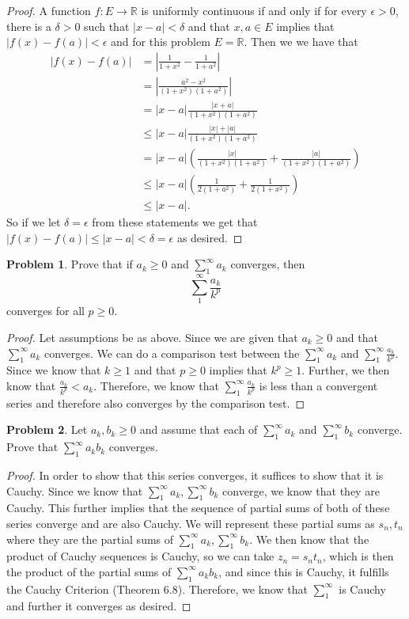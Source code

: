 \documentclass[11pt]{article}
\theoremstyle{definition}
\newtheorem{problem}{Problem}
\newcommand{\R}{\mathbb{R}}
\begin{document}
\begin{proof}
A function $f: E \rightarrow \R$ is uniformly continuous if and only if for every $\epsilon > 0$, there is a $\delta > 0$ such that $|x-a| < \delta$ and that $x, a\in E$ implies that $|f(x) - f(a)| < \epsilon$ and for this problem $E = \R$. Then we we have that
\begin{align*}
    |f(x) - f(a)| &= |\frac{1}{1+x^2}-\frac{1}{1+a^2}|\\
    &= |\frac{a^2 - x^2}{(1+x^2)(1+a^2)}|\\
    &= |x-a|\frac{|x+a|}{(1+x^2)(1+a^2)}\\
    &\leq |x-a|\frac{|x|+|a|}{(1+x^2)(1+a^2)}\\
    &= |x-a|(\frac{|x|}{(1+x^2)(1+a^2)} + \frac{|a|}{(1+x^2)(1+a^2)})\\
    &\leq |x-a|(\frac{1}{2(1+a^2)} + \frac{1}{2(1+x^2)})\\
    &\leq |x-a|.
\end{align*} So if we let $\delta = \epsilon$ from these statements we get that $|f(x)-f(a)| \leq |x-a| < \delta = \epsilon$ as desired.
\end{proof}

\pagebreak
\begin{problem}
Prove that if $a_k \geq 0$ and $\sum_1^\infty a_k$ converges, then 
\[
\sum_{1}^\infty \frac{a_k}{k^p}
\]
converges for all $p \geq 0$. 
\end{problem}

\begin{proof}
Let assumptions be as above. Since we are given that $a_k \geq 0$ and that $\sum_1^\infty a_k$ converges. We can do a comparison test between the $\sum_1^\infty a_k$ and $\sum_1^\infty \frac{a_k}{k^p}$. Since we know that $k\geq 1$ and that $p \geq 0$ implies that $k^p \geq 1$. Further, we then know that $\frac{a_k}{k^p} < a_k$. Therefore, we know that $\sum_1^\infty \frac{a_k}{k^p}$ is less than a convergent series and therefore also converges by the comparison test.
\end{proof}

\pagebreak
\begin{problem}
Let $a_k, b_k \geq 0$ and assume that each of $\sum_1^\infty a_k$ and 
$\sum_1^\infty b_k$ converge. Prove that $\sum_1^\infty a_k b_k$ converges. 
\end{problem}

\begin{proof}
In order to show that this series converges, it suffices to show that it is Cauchy. Since we know that $\sum_1^\infty a_k, \sum_1^\infty b_k$ converge, we know that they are Cauchy. This further implies that the sequence of partial sums of both of these series converge and are also Cauchy. We will represent these partial sums as $s_n, t_n$ where they are the partial sums of $\sum_1^\infty a_k, \sum_1^\infty b_k$. We then know that the product of Cauchy sequences is Cauchy, so we can take $z_n = s_nt_n$, which is then the product of the partial sums of $\sum_1^\infty a_kb_k$, and since this is Cauchy, it fulfills the Cauchy Criterion (Theorem 6.8). Therefore, we know that $\sum_1^\infty$ is Cauchy and further it converges as desired.
\end{proof}
\end{document}
